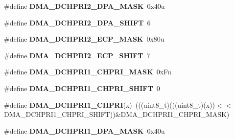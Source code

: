 \begin{DoxyCompactItemize}
\item 
\#define {\bfseries D\+M\+A\+\_\+\+D\+C\+H\+P\+R\+I2\+\_\+\+D\+P\+A\+\_\+\+M\+A\+SK}~0x40u\hypertarget{group__DMA__Register__Masks_gabb7c0ad697d56ee419d906f85515f222}{}\label{group__DMA__Register__Masks_gabb7c0ad697d56ee419d906f85515f222}

\item 
\#define {\bfseries D\+M\+A\+\_\+\+D\+C\+H\+P\+R\+I2\+\_\+\+D\+P\+A\+\_\+\+S\+H\+I\+FT}~6\hypertarget{group__DMA__Register__Masks_ga1bb0bb4e70fc28664327a789d7b3f174}{}\label{group__DMA__Register__Masks_ga1bb0bb4e70fc28664327a789d7b3f174}

\item 
\#define {\bfseries D\+M\+A\+\_\+\+D\+C\+H\+P\+R\+I2\+\_\+\+E\+C\+P\+\_\+\+M\+A\+SK}~0x80u\hypertarget{group__DMA__Register__Masks_ga5d73d5f6aae29465206f72cda9bccde6}{}\label{group__DMA__Register__Masks_ga5d73d5f6aae29465206f72cda9bccde6}

\item 
\#define {\bfseries D\+M\+A\+\_\+\+D\+C\+H\+P\+R\+I2\+\_\+\+E\+C\+P\+\_\+\+S\+H\+I\+FT}~7\hypertarget{group__DMA__Register__Masks_ga139a8b64a74b8009c858a68687a388aa}{}\label{group__DMA__Register__Masks_ga139a8b64a74b8009c858a68687a388aa}

\item 
\#define {\bfseries D\+M\+A\+\_\+\+D\+C\+H\+P\+R\+I1\+\_\+\+C\+H\+P\+R\+I\+\_\+\+M\+A\+SK}~0x\+Fu\hypertarget{group__DMA__Register__Masks_ga5a655b5899c5da64b36029329ff25fb8}{}\label{group__DMA__Register__Masks_ga5a655b5899c5da64b36029329ff25fb8}

\item 
\#define {\bfseries D\+M\+A\+\_\+\+D\+C\+H\+P\+R\+I1\+\_\+\+C\+H\+P\+R\+I\+\_\+\+S\+H\+I\+FT}~0\hypertarget{group__DMA__Register__Masks_ga3270315532805b61a878d4ab0e96045f}{}\label{group__DMA__Register__Masks_ga3270315532805b61a878d4ab0e96045f}

\item 
\#define {\bfseries D\+M\+A\+\_\+\+D\+C\+H\+P\+R\+I1\+\_\+\+C\+H\+P\+RI}(x)~(((uint8\+\_\+t)(((uint8\+\_\+t)(x))$<$$<$D\+M\+A\+\_\+\+D\+C\+H\+P\+R\+I1\+\_\+\+C\+H\+P\+R\+I\+\_\+\+S\+H\+I\+FT))\&D\+M\+A\+\_\+\+D\+C\+H\+P\+R\+I1\+\_\+\+C\+H\+P\+R\+I\+\_\+\+M\+A\+SK)\hypertarget{group__DMA__Register__Masks_gaddf04b7fae51a71b6e019f4b9394d156}{}\label{group__DMA__Register__Masks_gaddf04b7fae51a71b6e019f4b9394d156}

\item 
\#define {\bfseries D\+M\+A\+\_\+\+D\+C\+H\+P\+R\+I1\+\_\+\+D\+P\+A\+\_\+\+M\+A\+SK}~0x40u\hypertarget{group__DMA__Register__Masks_ga6a463897cc661b31a11d35fa0f31671a}{}\label{group__DMA__Register__Masks_ga6a463897cc661b31a11d35fa0f31671a}


\end{DoxyCompactItemize}
